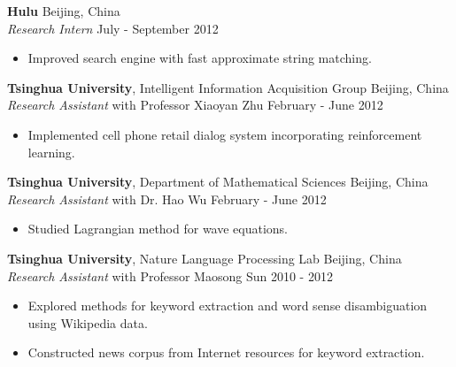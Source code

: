 \documentclass[a4paper,11pt]{article} %
\begin{document}

\textbf{Hulu} \hfill Beijing, China \\
\textit{Research Intern} \hfill July - September 2012
\vspace{-\parskip}
\begin{itemize}
  \item Improved search engine with fast approximate string matching.
\end{itemize}



\textbf{Tsinghua University}, Intelligent Information Acquisition Group \hfill Beijing, China \\
\textit{Research Assistant} with Professor Xiaoyan Zhu \hfill February - June 2012
\vspace{-\parskip}
\begin{itemize}
  \item Implemented cell phone retail dialog system incorporating reinforcement learning.
\end{itemize}


\textbf{Tsinghua University}, Department of Mathematical Sciences \hfill Beijing, China \\
\textit{Research Assistant} with Dr. Hao Wu \hfill February - June 2012
\vspace{-\parskip}
\begin{itemize}
  \item Studied Lagrangian method for wave equations.
\end{itemize}


\textbf{Tsinghua University}, Nature Language Processing Lab \hfill Beijing, China \\
\textit{Research Assistant} with Professor Maosong Sun \hfill 2010 - 2012
\vspace{-\parskip}
\begin{itemize}
  \item Explored methods for keyword extraction and word sense disambiguation using Wikipedia data.
  \item Constructed news corpus from Internet resources for keyword extraction.
\end{itemize}

\end{document}
